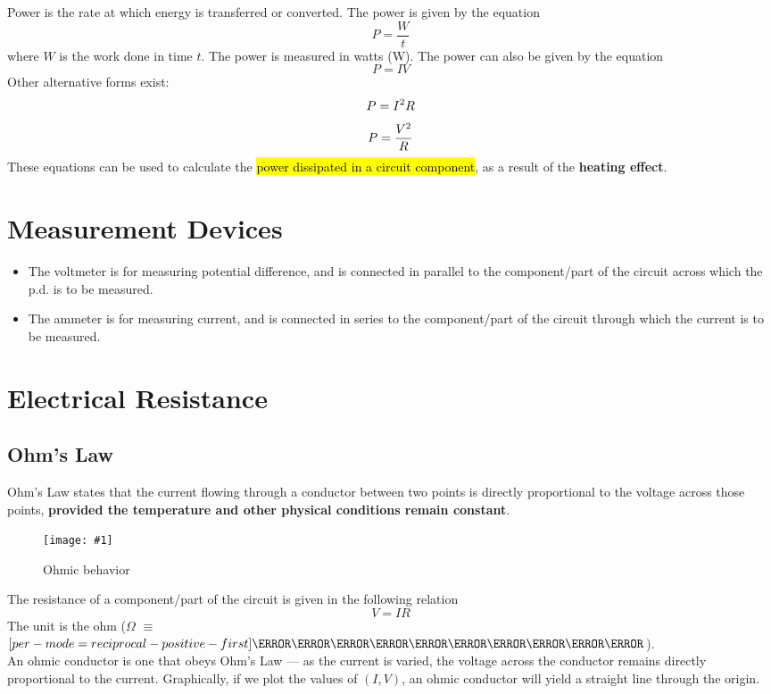 \documentclass[a4paper,12pt]{article}
\let\oldsection\section
\renewcommand\section{\clearpage\oldsection}
\let\oldsi\si
\renewcommand{\si}[1]{\oldsi[per-mode=reciprocal-positive-first]{#1}}
\newcommand{\lb}{\\[8pt]}
\newcommand{\img}[4]{\begin{center}
  \begin{figure}[H]
    \centering
    \texttt{[image: \#1]}
    \caption{#3}
    \label{fig:#4}
  \end{figure}
\end{center}}
\begin{document}
Power is the rate at which energy is transferred or converted. The power is given by the equation \begin{equation}
  P = \frac{W}{t}
\end{equation}where $W$ is the work done in time $t$. The power is measured in watts (W). The power can also be given by the equation $$P = IV$$
Other alternative forms exist:
\begin{equation}
  P = I^2R \\
\end{equation}
\begin{equation}
  P = \frac{V^2}{R} \\
\end{equation}
These equations can be used to calculate the \hl{power dissipated in a circuit component}, as a result of the \textbf{heating effect}.

\section{Measurement Devices}

\begin{itemize}
  \item The voltmeter is for measuring potential difference, and is connected in parallel to the component/part of the circuit across which the p.d. is to be measured.
  \item The ammeter is for measuring current, and is connected in series to the component/part of the circuit through which the current is to be measured.
\end{itemize}

\section{Electrical Resistance}

\subsection{Ohm's Law}

Ohm's Law states that the current flowing through a conductor between two points is directly proportional to the voltage across those points, \textbf{provided the temperature and other physical conditions remain constant}.
\img{ohmic.png}{0.7}{Ohmic behavior}{ohm}
The resistance of a component/part of the circuit is given in the following relation
\begin{equation}
  V = IR
\end{equation}
The unit is the ohm ($\Omega$ $\equiv$ $\si{\kilo\g\m\squared\per\s\cubed\per\A\squared}$).\lb
An ohmic conductor is one that obeys Ohm's Law --- as the current is varied, the voltage across the conductor remains directly proportional to the current. Graphically, if we plot the values of $(I, V)$, an ohmic conductor will yield a straight line through the origin.
\end{document}
